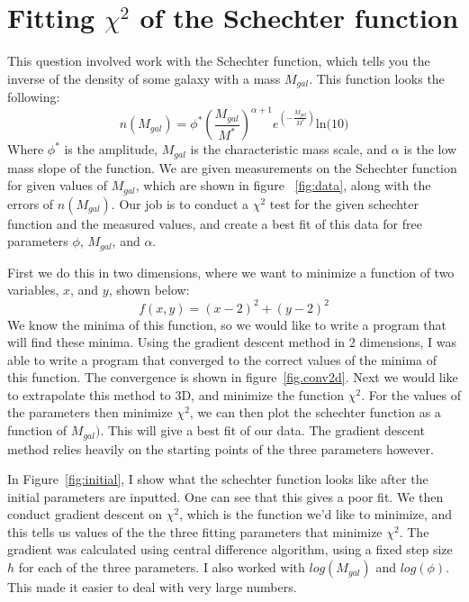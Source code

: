 \documentclass[12pt]{article}
\begin{document}
\newpage
\section{Fitting $\chi^2$ of the Schechter function}
This question involved work with the Schechter function, which tells you the inverse of the density of some galaxy with a mass $M_{gal}$. This function looks the following:
\begin{equation}
    n(M_{gal}) = \phi^*\left( \frac{M_{gal}}{M^*}\right)^{\alpha+1}e^{\left(-\frac{M_{gal}}{M^*}\right)}\text{ln(10)}
\end{equation}{}
Where $\phi^*$ is the amplitude, $M_{gal}$ is the characteristic mass scale, and $\alpha$ is the low mass slope of the function. We are given measurements on the Schechter function for given values of $M_{gal}$, which are shown in figure ~\ref{fig:data}, along with the errors of $n(M_{gal})$. Our job is to conduct a  $\chi^2$ test for the given schechter function and the measured values, and create a best fit of this data for free parameters $\phi$, $M_{gal}$, and $\alpha$.

First we do this in two dimensions, where we want to minimize a function of two variables, $x$, and $y$, shown below:
\begin{equation}
    f(x,y) = (x-2)^2+(y-2)^2
\end{equation}{}
We know the minima of this function, so we would like to write a program that will find these minima. Using the gradient descent method in 2 dimensions, I was able to write a program that converged to the correct values of the minima of this function. The convergence is shown in figure~\ref{fig.conv2d}. Next we would like to extrapolate this method to 3D, and minimize the function $\chi^2$. For the values of the parameters then minimize $\chi^2$, we can then plot the schechter function as a function of $M_{gal})$. This will give a best fit of our data. The gradient descent method relies heavily on the starting points of the three parameters however.

In Figure~\ref{fig:initial}, I show what the schechter function looks like after the initial parameters are inputted. One can see that this gives a poor fit. We then conduct gradient descent on $\chi^2$, which is the function we'd like to minimize, and this tells us values of the the three fitting parameters that minimize $\chi^2$. The gradient was calculated using central difference algorithm, using a fixed step size $h$ for each of the three parameters. I also worked with $log(M_{gal})$ and $log(\phi)$. This made it easier to deal with very large numbers.
\end{document}
